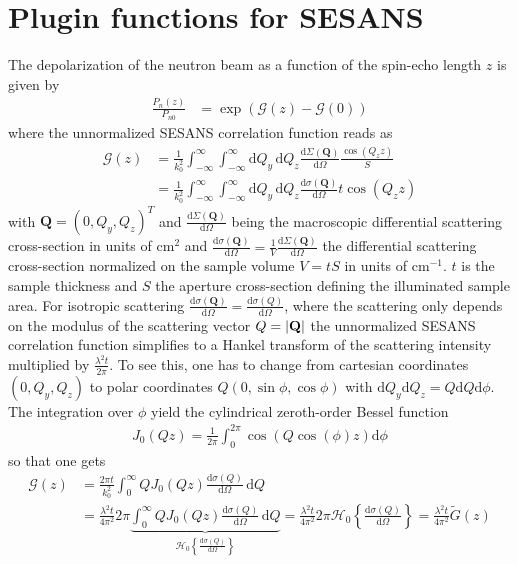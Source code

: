 \clearpage
\section{Plugin functions for SESANS}
\label{ch:pluginsSESANS}

The depolarization of the neutron beam as a function of the spin-echo length $z$ is given by
\begin{align}
\frac{P_n(z)}{P_{n0}}&=\exp\left(\mathcal{G}(z)-\mathcal{G}(0)\right)
\end{align}
where the unnormalized SESANS correlation function reads as
\begin{align}
\mathcal{G}(z) &= \frac{1}{k_0^2} \int_{-\infty}^{\infty}\int_{-\infty}^{\infty} \mathrm{d}Q_y\, \mathrm{d}Q_z \frac{\mathrm{d}\Sigma(\mathbf{Q})}{\mathrm{d}\Omega}\frac{\cos(Q_z z)}{S} \\
             &= \frac{1}{k_0^2} \int_{-\infty}^{\infty}\int_{-\infty}^{\infty} \mathrm{d}Q_y\, \mathrm{d}Q_z  \frac{\mathrm{d}\sigma(\mathbf{Q})}{\mathrm{d}\Omega}t \cos(Q_z z)
\end{align}
with $\mathbf{Q}=(0,Q_y,Q_z)^T$ and $\frac{\mathrm{d}\Sigma(\mathbf{Q})}{\mathrm{d}\Omega}$ being the macroscopic differential scattering cross-section in units of cm$^2$ and $\frac{\mathrm{d}\sigma(\mathbf{Q})}{\mathrm{d}\Omega}=\frac{1}{V}\frac{\mathrm{d}\Sigma(\mathbf{Q})}{\mathrm{d}\Omega}$ the differential scattering cross-section normalized on the sample volume $V=tS$ in units of cm$^{-1}$. $t$ is the sample thickness and $S$ the aperture cross-section defining the illuminated sample area. For isotropic scattering $\frac{\mathrm{d}\sigma(\mathbf{Q})}{\mathrm{d}\Omega}=\frac{\mathrm{d}\sigma(Q)}{\mathrm{d}\Omega}$, where the scattering only depends on the modulus of the scattering vector $Q=\abs{\mathbf{Q}}$ the unnormalized SESANS correlation function simplifies to a Hankel transform of the scattering intensity multiplied by $\frac{\lambda^2 t}{2\pi}$. To see this, one has to change from cartesian coordinates $(0,Q_y,Q_z)$ to polar coordinates $Q (0,\sin\phi,\cos\phi)$ with $\mathrm{d}Q_y \mathrm{d}Q_z = Q\mathrm{d}Q \mathrm{d}\phi$. The integration over $\phi$ yield the cylindrical zeroth-order Bessel function
\begin{align}
J_0(Qz)=\frac{1}{2\pi}\int_{0}^{2\pi} \cos\left(Q\cos(\phi)z\right) \mathrm{d}\phi
\end{align}
so that one gets
\begin{align}
\mathcal{G}(z) &= \frac{2\pi t}{k_0^2} \int_{0}^{\infty} Q J_0(Qz) \frac{\mathrm{d}\sigma(Q)}{\mathrm{d}\Omega} \, \mathrm{d}Q \\
&= \frac{\lambda^2 t}{4\pi^2} 2\pi\underbrace{\int_{0}^{\infty} Q J_0(Qz) \frac{\mathrm{d}\sigma(Q)}{\mathrm{d}\Omega} \, \mathrm{d}Q}_{\mathcal{H}_0\left\{\frac{\mathrm{d}\sigma(Q)}{\mathrm{d}\Omega}\right\}} = \frac{\lambda^2 t}{4\pi^2}  2\pi \mathcal{H}_0\left\{\frac{\mathrm{d}\sigma(Q)}{\mathrm{d}\Omega}\right\} = \frac{\lambda^2 t}{4\pi^2} \tilde{G}(z)
\end{align}
